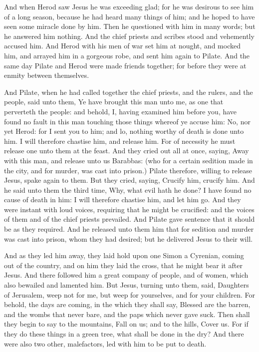 And when Herod saw Jesus he was exceeding glad; for he was desirous to see him of a long season, because he had heard many things of him; and he hoped to have seen some miracle done by him. Then he questioned with him in many words; but he answered him nothing. And the chief priests and scribes stood and vehemently accused him. And Herod with his men of war set him at nought, and mocked him, and arrayed him in a gorgeous robe, and sent him again to Pilate. And the same day Pilate and Herod were made friends together; for before they were at enmity between themselves.

And Pilate, when he had called together the chief priests, and the rulers, and the people, said unto them, Ye have brought this man unto me, as one that perverteth the people: and behold, I, having examined him before you, have found no fault in this man touching those things whereof ye accuse him: No, nor yet Herod: for I sent you to him; and lo, nothing worthy of death is done unto him. I will therefore chastise him, and release him. For of necessity he must release one unto them at the feast. And they cried out all at once, saying, Away with this man, and release unto us Barabbas: (who for a certain sedition made in the city, and for murder, was cast into prison.) Pilate therefore, willing to release Jesus, spake again to them. But they cried, saying, Crucify him, crucify him. And he said unto them the third time, Why, what evil hath he done? I have found no cause of death in him: I will therefore chastise him, and let him go. And they were instant with loud voices, requiring that he might be crucified: and the voices of them and of the chief priests prevailed. And Pilate gave sentence that it should be as they required. And he released unto them him that for sedition and murder was cast into prison, whom they had desired; but he delivered Jesus to their will.

And as they led him away, they laid hold upon one Simon a Cyrenian, coming out of the country, and on him they laid the cross, that he might bear it after Jesus. And there followed him a great company of people, and of women, which also bewailed and lamented him. But Jesus, turning unto them, said, Daughters of Jerusalem, weep not for me, but weep for yourselves, and for your children. For behold, the days are coming, in the which they shall say, Blessed are the barren, and the wombs that never bare, and the paps which never gave suck. Then shall they begin to say to the mountains, Fall on us; and to the hills, Cover us. For if they do these things in a green tree, what shall be done in the dry? And there were also two other, malefactors, led with him to be put to death.

